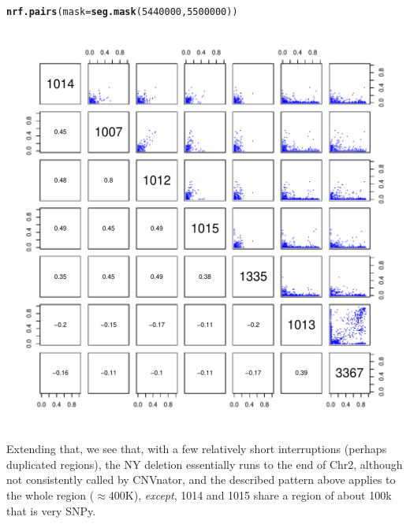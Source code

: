 \documentclass{article}\usepackage[]{graphicx}\usepackage[]{color}
\makeatletter
\def\maxwidth{ %
  \ifdim\Gin@nat@width>\linewidth
    \linewidth
  \else
    \Gin@nat@width
  \fi
}
\newcommand{\hlnum}[1]{\textcolor[rgb]{0.686,0.059,0.569}{#1}}%
\newcommand{\hlstd}[1]{\textcolor[rgb]{0.345,0.345,0.345}{#1}}%
\newcommand{\hlkwc}[1]{\textcolor[rgb]{0.333,0.667,0.333}{#1}}%
\newcommand{\hlkwd}[1]{\textcolor[rgb]{0.737,0.353,0.396}{\textbf{#1}}}%
\newenvironment{kframe}{%
 \def\at@end@of@kframe{}%
 \ifinner\ifhmode%
  \def\at@end@of@kframe{\end{minipage}}%
  \begin{minipage}{\columnwidth}%
 \fi\fi%
 \def\FrameCommand##1{\hskip\@totalleftmargin \hskip-\fboxsep
 \colorbox{shadecolor}{##1}\hskip-\fboxsep
     \hskip-\linewidth \hskip-\@totalleftmargin \hskip\columnwidth}%
 \MakeFramed {\advance\hsize-\width
   \@totalleftmargin\z@ \linewidth\hsize
   \@setminipage}}%
 {\par\unskip\endMakeFramed%
 \at@end@of@kframe}
\newenvironment{knitrout}{}{} %
\makeatother
\begin{document}
\begin{knitrout}\footnotesize
{}\color{fgcolor}\begin{kframe}
\begin{alltt}
\hlkwd{nrf.pairs}\hlstd{(}\hlkwc{mask}\hlstd{=}\hlkwd{seg.mask}\hlstd{(}\hlnum{5440000}\hlstd{,}\hlnum{5500000}\hlstd{))}
\end{alltt}
\end{kframe}

{\centering \includegraphics[width=\maxwidth]{figs-knitr/unnamed-chunk-36-1} 

}



\end{knitrout}


Extending that, we see that, with a few relatively short interruptions (perhaps duplicated regions), the NY deletion essentially runs to the end of Chr2, although not consistently called by CNVnator, and the described pattern above applies to the whole region ($\approx 400$K), \emph{except}, 1014 and 1015 share a region of about 100k that is very SNPy.
\end{document}
